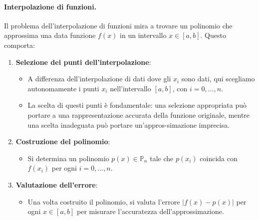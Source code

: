 \documentclass{article}
\begin{document}
\paragraph{Interpolazione di funzioni.}
Il problema dell'interpolazione di funzioni mira a trovare un polinomio che
approssima una data funzione $f(x)$ in un intervallo $x\in[a,b]$. Questo
comporta:
\begin{enumerate}
    \item \textbf{Selezione dei punti dell'interpolazione}:
        \begin{itemize}
            \item A differenza dell'interpolazione di dati dove gli $x_i$ sono
                dati, qui scegliamo autonomamente i punti $x_i$ nell'intervallo
                $[a,b]$, con $i=0,\ldots,n$.
            \item La scelta di questi punti è fondamentale: una selezione
                appropriata può portare a una rappresentazione accurata della
                funzione originale, mentre una scelta inadeguata può portare
                un'appros-simazione imprecisa.
        \end{itemize}
    \item \textbf{Costruzione del polinomio}:
        \begin{itemize}
            \item Si determina un polinomio $p(x)\in \mathbb{P}_n$ tale che
                $p(x_i)$ coincida con $f(x_i)$ per ogni $i=0,\ldots,n$.
        \end{itemize}
    \item \textbf{Valutazione dell'errore}:
        \begin{itemize}
            \item Una volta costruito il polinomio, si valuta l'errore
                $\left\lvert f(x) - p(x)\right\rvert$ per ogni $x\in[a,b]$ per
                misurare l'accuratezza dell'approssimazione.
        \end{itemize}
\end{enumerate}
\end{document}
